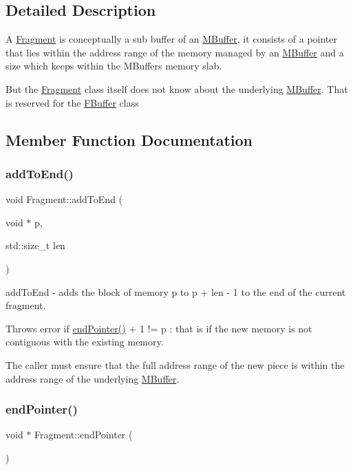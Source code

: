 \subsection{Detailed Description}
A \hyperlink{class_fragment}{Fragment} is conceptually a sub buffer of an \hyperlink{struct_m_buffer}{M\+Buffer}, it consists of a pointer that lies within the address range of the memory managed by an \hyperlink{struct_m_buffer}{M\+Buffer} and a size which keeps within the M\+Buffers memory slab.

But the \hyperlink{class_fragment}{Fragment} class itself does not know about the underlying \hyperlink{struct_m_buffer}{M\+Buffer}. That is reserved for the \hyperlink{class_f_buffer}{F\+Buffer} class 

\subsection{Member Function Documentation}
\mbox{\label{class_fragment_adabfe8ce7f415878540ded507c0e23cd}} 
\subsubsection{\texorpdfstring{add\+To\+End()}{addToEnd()}}
{\footnotesize\ttfamily void Fragment\+::add\+To\+End (\begin{DoxyParamCaption}\item[{void $\ast$}]{p,  }\item[{std\+::size\+\_\+t}]{len }\end{DoxyParamCaption})}

add\+To\+End -\/ adds the block of memory p to p + len -\/ 1 to the end of the current fragment.

Throws error if \hyperlink{class_fragment_ab3bdf2bc0dc50407a572f48eced6b3f6}{end\+Pointer()} + 1 != p \+: that is if the new memory is not contiguous with the existing memory.

The caller must ensure that the full address range of the new piece is within the address range of the underlying \hyperlink{struct_m_buffer}{M\+Buffer}. \mbox{\label{class_fragment_ab3bdf2bc0dc50407a572f48eced6b3f6}} 
\subsubsection{\texorpdfstring{end\+Pointer()}{endPointer()}}
{\footnotesize\ttfamily void $\ast$ Fragment\+::end\+Pointer (\begin{DoxyParamCaption}{ }\end{DoxyParamCaption})}

